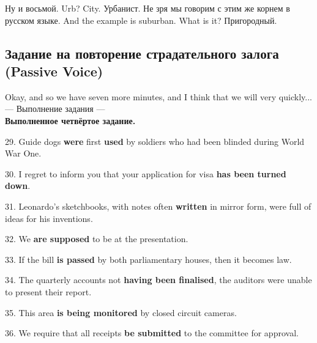 \documentclass[main.tex]{subfiles}
\begin{document}
Ну и восьмой. Urb?
City. Урбанист.
Не зря мы говорим с этим же корнем в русском языке.
And the example is suburban.
What is it? Пригородный.

\subsection{Задание на повторение страдательного залога (Passive Voice)}

Okay, and so we have seven more minutes, and I think that we will very quickly...
\\

--- Выполнение задания ---
\\

\textbf{Выполненное четвёртое задание.}

29. Guide dogs \textbf{were} first \textbf{used} by soldiers who had been blinded during World War One.

30. I regret to inform you that your application for visa \textbf{has been turned down}.

31. Leonardo's sketchbooks, with notes often \textbf{written} in mirror form, were full of ideas for his inventions.

32. We \textbf{are supposed} to be at the presentation.

33. If the bill \textbf{is passed} by both parliamentary houses, then it becomes law.

34. The quarterly accounts not \textbf{having been finalised}, the auditors were unable to present their report.

35. This area \textbf{is being monitored} by closed circuit cameras.

36. We require that all receipts \textbf{be submitted} to the committee for approval.
\\
\end{document}
